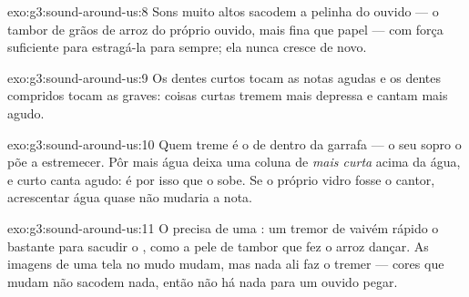 \begin{solution}{exo:g3:sound-around-us:8}
Sons muito altos sacodem a pelinha do ouvido --- o tambor de grãos de
arroz do próprio ouvido, mais fina que papel --- com força suficiente
para estragá-la para sempre; ela nunca cresce de novo.
\end{solution}

\begin{solution}{exo:g3:sound-around-us:9}
Os dentes curtos tocam as notas agudas e os dentes compridos tocam as
graves: coisas curtas tremem mais depressa e cantam mais agudo.
\end{solution}

\begin{solution}{exo:g3:sound-around-us:10}
Quem treme é o  de dentro da garrafa --- o seu sopro o põe a
estremecer. Pôr mais água deixa uma coluna de  \emph{mais curta}
acima da água, e curto canta agudo: é por isso que o  sobe. Se o
próprio vidro fosse o cantor, acrescentar água quase não mudaria a
nota.
\end{solution}

\begin{solution}{exo:g3:sound-around-us:11}
O  precisa de uma \emph{}: um tremor de vaivém rápido o
bastante para sacudir o , como a pele de tambor que fez o arroz
dançar. As imagens de uma tela no mudo mudam, mas nada ali faz o 
tremer --- cores que mudam não sacodem nada, então não há nada para
um ouvido pegar.
\end{solution}
